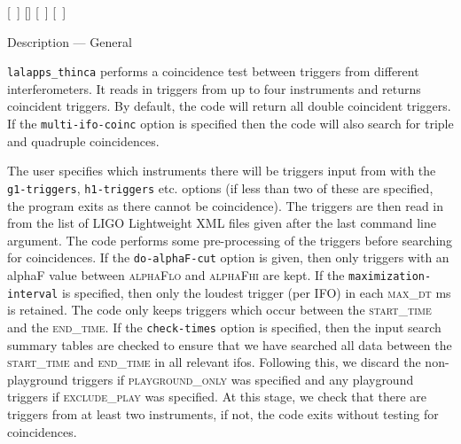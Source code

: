 \begin{entry}
  \newline \hspace*{0.5in}
[~] \newline \hspace*{0.5in}  
[]  \newline \hspace*{0.5in}
[~] \newline \hspace*{0.5in}
[~]  \newline \hspace*{0.5in}
\newline \hspace*{0.5in}

\item[Description --- General] 

\verb$lalapps_thinca$ performs a coincidence test between triggers from
different interferometers.  It reads in triggers from up to four instruments
and returns coincident triggers.  By default, the code will return all double
coincident triggers.  If the \texttt{multi-ifo-coinc} option is specified then
the code will also search for triple and quadruple coincidences.

The user specifies which instruments there will be triggers input from with
the \texttt{g1-triggers}, \texttt{h1-triggers} etc. options (if less than two
of these are specified, the program exits as there cannot be coincidence).
The triggers are then read in from the list of LIGO Lightweight XML files
given after the last command line argument.  The code performs some
pre-processing of the triggers before searching for coincidences.  If the
\texttt{do-alphaF-cut} option is given, then only triggers with an alphaF
value between \textsc{alphaFlo} and \textsc{alphaFhi} are kept.  If the
\texttt{maximization-interval} is specified, then only the loudest trigger
(per IFO) in each \textsc{max\_dt} ms is retained.  The code only keeps
triggers which occur between the \textsc{start\_time} and the
\textsc{end\_time}.  If the \texttt{check-times} option is specified, then the
input search summary tables are checked to ensure that we have searched all
data between the \textsc{start\_time} and \textsc{end\_time} in all relevant
ifos.  Following this, we discard the non-playground triggers if
\textsc{playground\_only} was specified and any playground triggers if
\textsc{exclude\_play} was specified.  At this stage, we check that there are
triggers from at least two instruments, if not, the code exits without testing
for coincidences. 


\end{entry}
